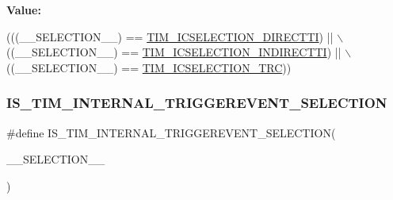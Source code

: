 {\bfseries Value\+:}
\begin{DoxyCode}
(((\_\_SELECTION\_\_) == \hyperlink{group___t_i_m___input___capture___selection_gac3be2fd9c576e84e0ebcfc7b3c0773a3}{TIM\_ICSELECTION\_DIRECTTI}) || \(\backslash\)
                                            ((\_\_SELECTION\_\_) == 
      \hyperlink{group___t_i_m___input___capture___selection_gab9754d4318abcd7fe725e3ee2e4496d4}{TIM\_ICSELECTION\_INDIRECTTI}) || \(\backslash\)
                                            ((\_\_SELECTION\_\_) == 
      \hyperlink{group___t_i_m___input___capture___selection_ga9e0191bbf1a82dd9150b9283c39276e7}{TIM\_ICSELECTION\_TRC}))
\end{DoxyCode}
\mbox{\label{group___t_i_m___private___macros_ga48eee98612db56131414fdacc7a5743d}} 
\subsubsection{\texorpdfstring{I\+S\+\_\+\+T\+I\+M\+\_\+\+I\+N\+T\+E\+R\+N\+A\+L\+\_\+\+T\+R\+I\+G\+G\+E\+R\+E\+V\+E\+N\+T\+\_\+\+S\+E\+L\+E\+C\+T\+I\+ON}{IS\_TIM\_INTERNAL\_TRIGGEREVENT\_SELECTION}}
{\footnotesize\ttfamily \#define I\+S\+\_\+\+T\+I\+M\+\_\+\+I\+N\+T\+E\+R\+N\+A\+L\+\_\+\+T\+R\+I\+G\+G\+E\+R\+E\+V\+E\+N\+T\+\_\+\+S\+E\+L\+E\+C\+T\+I\+ON(\begin{DoxyParamCaption}\item[{}]{\+\_\+\+\_\+\+S\+E\+L\+E\+C\+T\+I\+O\+N\+\_\+\+\_\+ }\end{DoxyParamCaption})}

